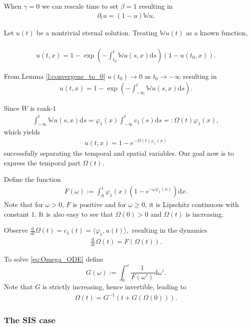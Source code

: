 \documentclass{article}
\renewcommand{\d}{\mathrm{d}}
\newcommand{\W}{\mathbb{W}}
\newcommand{\1}[1]{{\mathds{1}}_{\left\{#1\right\}}}
\begin{document}
When $\gamma=0$ we can rescale time to set $\beta=1$ resulting in
\begin{align*}
\partial_t u=(1-u)\W u.	
\end{align*}	


Let $u(t)$ be a nontrivial eternal solution. Treating $\W u(t)$ as a known function, \
\begin{align*}
u(t,x)=1-\exp\left( -\int_{t_0}^{t} \W u(s,x) \d s\right)(1-u(t_0,x)).
\end{align*}

From Lemma \ref{l:convergene_to_0} $u(t_0) \to 0$ as $t_0 \to -\infty$ resulting in
\begin{align*}
u(t,x)=1-\exp\left( -\int_{-\infty}^{t}  \W u(s,x) \d s\right).
\end{align*}

Since $W$ is rank-$1$
\begin{align*}
\int_{-\infty}^{t}  \W u(s,x) \d s=\varphi_1(x)\int_{-\infty}^{t} c_1(s) \d s=:\Omega(t)\varphi_1(x),
\end{align*}
which yields
\begin{align}
\label{eq:SI_explicit1}
u(t,x)=1-e^{-\Omega(t)\varphi_1(x)}
\end{align}
successfully separating the temporal and spatial variables. Our goal now is to express the temporal part $\Omega(t).$

Define the function
\begin{align}
\label{eq:F}
F(\omega):=\int_{0}^{1} \varphi_1(x)\left(1-e^{-\omega \varphi_1(x)} \right) \d x.
\end{align}
Note that for $\omega> 0$, $F$ is positive and for $\omega \geq 0$, it is Lipschitz continuous with constant $1$. It is also easy to see that $\Omega(0)>0$ and $\Omega(t)$ is increasing.

Observe $\frac{\d}{\d t} \Omega(t)=c_1(t)=\langle \varphi_1,u(t) \rangle,$ resulting in the dynamics
\begin{align}
\label{eq:Omega_ODE}
\frac{\d}{\d t} \Omega(t)=F(\Omega(t)).
\end{align}

To solve \eqref{eq:Omega_ODE} define
$$G(\omega):=\int_{0}^{\omega} \frac{1}{F(\omega')} \d \omega'.$$
Note that $G$ is strictly increasing, hence invertible, leading to
\begin{align}
\Omega(t)=G^{-1}\left(t+G(\Omega(0)) \right).
\end{align}


\subsubsection*{The SIS case}
\end{document}
